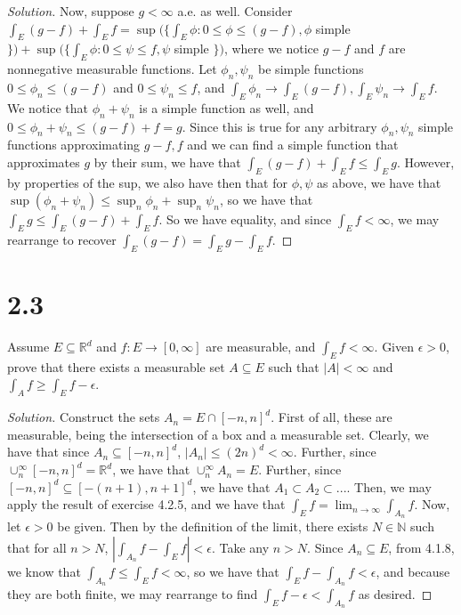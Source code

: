 \documentclass[10pt]{article}
\newenvironment{problem}[2][Problem]{\begin{trivlist}
\item[\hskip \labelsep {\bfseries #1}\hskip \labelsep {\bfseries #2.}]}{\end{trivlist}}
\begin{document}
\begin{proof}[Solution]
Now, suppose $g < \infty$ a.e. as well. Consider $\int_E (g-f) + \int_E f =  \sup(\{ \int_E \phi : 0 \leq \phi \leq (g-f), \phi$ simple $\}) +  \sup(\{ \int_E \phi : 0 \leq \psi \leq f, \psi$ simple $\})$, where we notice $g-f$ and $f$ are nonnegative measurable functions. Let $\phi_n, \psi_n$ be simple functions $0 \leq \phi_n \leq (g-f)$ and $0 \leq \psi_n \leq f$, and $\int_E \phi_n \to \int_E (g-f), \int_E \psi_n  \to \int_E f$. We notice that $\phi_n + \psi_n$ is a simple function as well, and $0 \leq \phi_n + \psi_n \leq (g - f) + f = g$. Since this is true for any arbitrary $\phi_n, \psi_n$ simple functions approximating $g-f,f$ and we can find a simple function that approximates $g$ by their sum, we have that $ \int_E (g-f) + \int_E f \leq \int_E g$. However, by properties of the sup, we also have then that for $\phi,\psi$ as above, we have that $\sup (\phi_n + \psi_n) \leq \sup_n \phi_n + \sup_n \psi_n$, so we have that $\int_E g \leq \int_E (g-f) + \int_E f$. So we have equality, and since $\int_E f < \infty$, we may rearrange to recover $\int_E (g-f) = \int_E g - \int_E f$.
\end{proof}

\section*{2.3}

\begin{problem}{4.2.11}
Assume $E \subseteq \mathbb{R}^d$ and $f: E \to [0,\infty]$ are measurable, and $\int_E f < \infty$. Given $\epsilon > 0$, prove that there exists a measurable set $A \subseteq E$ such that $|A| < \infty$ and $\int_A f \geq \int_E f - \epsilon$.
\end{problem}
\begin{proof}[Solution]
Construct the sets $A_n = E \cap [-n,n]^d$. First of all, these are measurable, being the intersection of a box and a measurable set. Clearly, we have that since $A_n \subseteq [-n,n]^d$, $|A_n| \leq (2n)^d < \infty$. Further, since $\cup_n^\infty [-n,n]^d = \mathbb{R}^d$, we have that $\cup_n^\infty A_n = E$. Further, since $[-n,n]^d \subseteq [-(n+1),n+1]^d$, we have that $A_1 \subset A_2 \subset ...$. Then, we may apply the result of exercise 4.2.5, and we have that $ \int_E f = \lim_{n \to \infty} \int_{A_n} f$. Now, let $\epsilon > 0$ be given. Then by the definition of the limit, there exists $N \in \mathbb{N}$ such that for all $n > N$, $| \int_{A_n} f  - \int_E f | < \epsilon$. Take any $n > N$. Since $A_n \subseteq E$, from 4.1.8, we know that $\int_{A_n} f \leq \int_E f < \infty$, so we have that $\int_E f - \int_{A_n} f< \epsilon$, and because they are both finite, we may rearrange to find $\int_E f - \epsilon < \int_{A_n} f$ as desired.


\end{proof}
\end{document}
